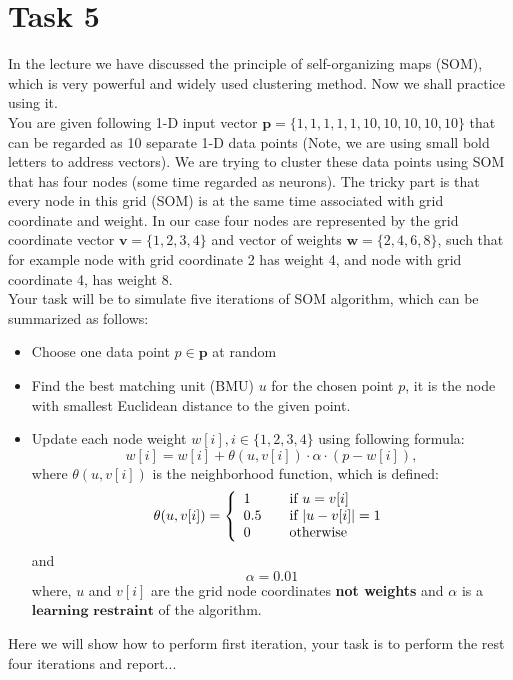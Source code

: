 \documentclass{article}
\begin{document}
\section*{Task 5}
In the lecture we have discussed the principle of self-organizing maps (SOM), which is very powerful and widely used clustering method. Now we shall practice using it.\\ You are given following 1-D input vector $\textbf{p} = \{1,1,1,1,1,10,10,10,10,10\}$ that can be regarded as 10 separate 1-D data points (Note, we are using small bold letters to address vectors). We are trying to cluster these data points using SOM that has four nodes (some time regarded as neurons). The tricky part is that every node in this grid (SOM) is at the same time associated with grid coordinate and weight. In our case four nodes are represented by the grid coordinate vector $\textbf{v} = \{1,2,3,4\}$ and vector of weights  $\textbf{w} = \{2,4,6,8\}$, such that for example node with grid coordinate 2 has weight 4, and node with grid coordinate 4, has weight 8.\\
Your task will be to simulate five iterations of SOM algorithm, which can be summarized as follows: 
\begin{itemize}
\item Choose one data point $p \in\textbf{p}$ at random
\item Find the best matching unit (BMU) $u$  for the chosen point $p$, it is the node with smallest Euclidean distance to the given point.
\item Update  each node weight $w[i], i \in \{1,2,3,4\}$ using following formula:
$$
w[i] = w[i] + \theta(u, v[i])\cdot\alpha\cdot(p - w[i]),
$$
where  $\theta(u,v[i])$ is the neighborhood function, which is defined:
\[ \theta(u, v[i]) = \left\{ 
  \begin{array}{l l}
    1 & \quad \text{if $u = v[i]$}\\
    0.5 & \quad \text{if $|u - v[i]| = 1$}\\
    0 & \quad \text{otherwise}
 \end{array} \right.\]
and
$$
\alpha = 0.01
$$
where, $u$ and $v[i]$ are the grid node coordinates \textbf{not  weights} and $\alpha$ is a $\textbf{learning restraint}$ of the algorithm.

\end{itemize}

Here we will show how to perform first iteration, your task is to perform the rest four iterations and report...
\end{document}
